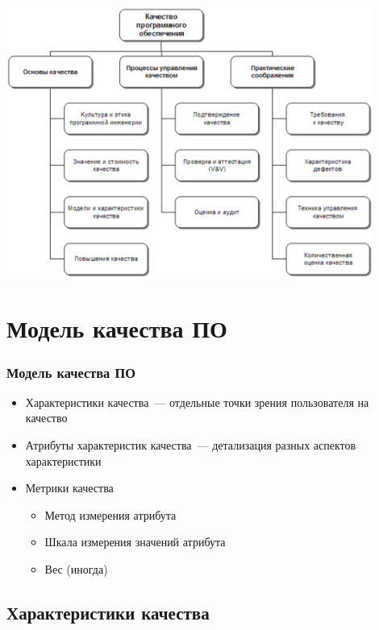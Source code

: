 \documentclass{../../slides-style}
\begin{document}
    \begin{frame}
        \begin{center}
            \includegraphics[width=0.9\textwidth]{quality.png}
        \end{center}
    \end{frame}

    \section{Модель качества ПО}

    \begin{frame}
        \frametitle{Модель качества ПО}
        \begin{itemize}
            \item Характеристики качества~--- отдельные точки зрения пользователя на качество
            \item Атрибуты характеристик качества~--- детализация разных аспектов характеристики
            \item Метрики качества
            \begin{itemize}
                \item Метод измерения атрибута
                \item Шкала измерения значений атрибута
                \item Вес (иногда)
            \end{itemize}
        \end{itemize}
    \end{frame}

    \subsection{Характеристики качества}
\end{document}
